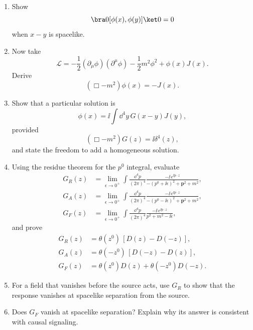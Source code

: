 \begin{enumerate}
\begin{enumerate}
Although \(D(z)\) is nonzero at spacelike separation, relativistic
locality concerns the propagation of a change in the state, not the
existence of vacuum correlations.
\item
Show
\[
 \bra0[\phi(x),\phi(y)]\ket0=0
\]
when \(x-y\) is spacelike.
\item
Now take
\[
 \mathcal L=-\frac12(\partial_\mu\phi)(\partial^\mu\phi)
 -\frac12m^2\phi^2+\phi(x)J(x).
\]
Derive
\[
 (\Box-m^2)\phi(x)=-J(x).
\]
\item
Show that a particular solution is
\[
 \phi(x)=\ii\int \dd^4y\,G(x-y)J(y),
\]
provided
\[
 (\Box-m^2)G(z)=\ii\delta^4(z),
\]
and state the freedom to add a homogeneous solution.
\item
Using the residue theorem for the \(p^0\) integral, evaluate
\[
\begin{split}
G_R(z)&=\lim_{\epsilon\to0^+}\int\frac{\dd^4p}{(2\pi)^4}
\frac{-\ii\,e^{\ii p\cdot z}}
{-(p^0+\ii\epsilon)^2+\mathbf p^2+m^2},\\
G_A(z)&=\lim_{\epsilon\to0^+}\int\frac{\dd^4p}{(2\pi)^4}
\frac{-\ii\,e^{\ii p\cdot z}}
{-(p^0-\ii\epsilon)^2+\mathbf p^2+m^2},\\
G_F(z)&=\lim_{\epsilon\to0^+}\int\frac{\dd^4p}{(2\pi)^4}
\frac{-\ii\,e^{\ii p\cdot z}}{p^2+m^2-\ii\epsilon},
\end{split}
\]
and prove
\[
\begin{split}
G_R(z)&=\theta(z^0)\,[D(z)-D(-z)],\\
G_A(z)&=\theta(-z^0)\,[D(-z)-D(z)],\\
G_F(z)&=\theta(z^0)D(z)+\theta(-z^0)D(-z).
\end{split}
\]
\item
For a field that vanishes before the source acts, use \(G_R\) to show
that the response vanishes at spacelike separation from the source.
\item
Does \(G_F\) vanish at spacelike separation?  Explain why its answer is
consistent with causal signaling.
\end{enumerate}


\end{enumerate}
